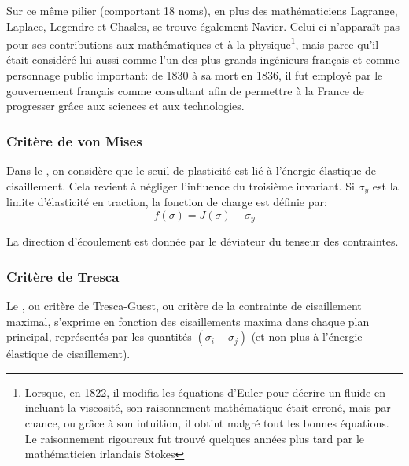 \begin{histoire}
\medskip
Sur ce même pilier (comportant 18 noms), en plus des mathématiciens Lagrange, 
Laplace, Legendre 
et Chasles, se trouve
également Navier. 
Celui-ci n'apparaît pas pour ses contributions aux mathématiques et à la physique\footnote{%
Lorsque, en 1822, il modifia les équations d'Euler pour décrire un fluide en incluant la viscosité, son raisonnement
mathématique était erroné, mais par chance, ou grâce à son intuition, il obtint malgré tout les bonnes
équations. Le raisonnement rigoureux fut trouvé quelques années plus tard par le mathématicien irlandais 
Stokes}, mais
parce qu'il était considéré lui-aussi comme l'un des plus grands ingénieurs français et comme personnage
public important: de 1830 à sa mort en 1836, il fut employé par le gouvernement français comme consultant
afin de permettre à la France de progresser grâce aux sciences et aux technologies.
\end{histoire}


\medskip
\subsubsection{Critère de von Mises}

Dans le , 
on considère que le seuil de plasticité est lié à l'énergie élastique de
cisaillement. Cela revient à négliger l'influence du troisième invariant. 
Si $\sigma_y$ est la limite d'élasticité en traction, la fonction de charge est définie par:
\begin{equation} f(\sigma) = J(\sigma) - \sigma_y \end{equation}

La direction d'écoulement est donnée par le déviateur du tenseur des contraintes.

\medskip
\subsubsection{Critère de Tresca}

Le ,  
ou critère de Tresca-Guest, ou critère de la contrainte de 
cisaillement maximal, s'exprime en fonction des cisaillements maxima dans chaque plan principal, représentés 
par les quantités $(\sigma_i-\sigma_j)$ (et non plus à l'énergie élastique de cisaillement).


